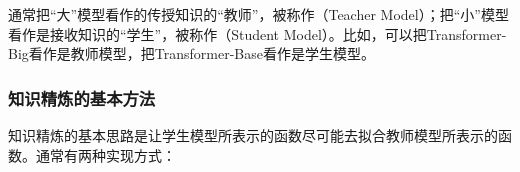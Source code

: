 \parinterval 通常把``大''模型看作的传授知识的``教师''，被称作{\small{}}（Teacher Model）；把``小''模型看作是接收知识的``学生''，被称作{\small{}}（Student Model）。比如，可以把Transformer-Big看作是教师模型，把Transformer-Base看作是学生模型。


\subsubsection{知识精炼的基本方法}

\parinterval 知识精炼的基本思路是让学生模型所表示的函数尽可能去拟合教师模型所表示的函数\cite{Hinton2015Distilling}。通常有两种实现方式\cite{DBLP:conf/emnlp/KimR16}：


